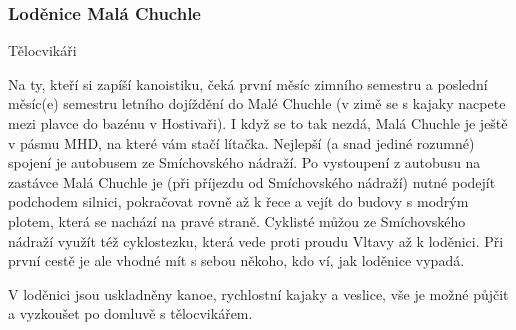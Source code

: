 \subsubsection{Loděnice Malá Chuchle}

{Tělocvikáři}

Na ty, kteří si zapíší kanoistiku, čeká první měsíc zimního semestru a poslední měsíc(e) semestru letního dojíždění do
Malé Chuchle (v zimě se s kajaky nacpete mezi plavce do bazénu v Hostivaři). I když se to tak nezdá, Malá Chuchle je
ještě v pásmu MHD, na které vám stačí lítačka. Nejlepší (a snad jediné rozumné) spojení je autobusem ze Smíchovského
nádraží. Po vystoupení z autobusu na zastávce Malá Chuchle je (při příjezdu od Smíchovského nádraží) nutné podejít
podchodem silnici, pokračovat rovně až k řece a vejít do budovy s modrým plotem, která se nachází na pravé straně.
Cyklisté můžou ze Smíchovského nádraží využít též cyklostezku, která vede proti proudu Vltavy až k loděnici. Při první
cestě je ale vhodné mít s sebou někoho, kdo ví, jak loděnice vypadá.


V loděnici jsou uskladněny kanoe, rychlostní kajaky a veslice, vše je možné půjčit a vyzkoušet po domluvě s
tělocvikářem.